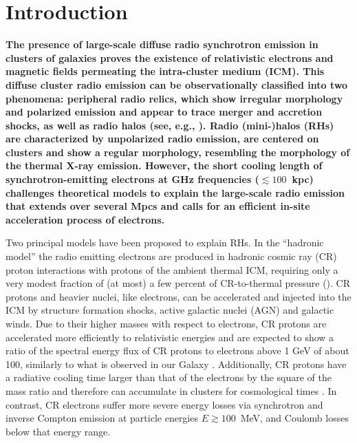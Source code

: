 \documentclass[useAMS,usenatbib]{mn2e}
\begin{document}
\section{Introduction}
\label{sec:1}

{\bf The presence of large-scale diffuse radio synchrotron emission in clusters
  of galaxies proves the existence of relativistic electrons and magnetic fields
  permeating the intra-cluster medium (ICM). This diffuse cluster radio emission
  can be observationally classified into two phenomena: peripheral radio relics,
  which show irregular morphology and polarized emission and appear to trace
  merger and accretion shocks, as well as radio halos (see, e.g.,
  \citealp{2012A&ARv..20...54F}).  Radio \mbox{(mini-)}halos (RHs) are
  characterized by unpolarized radio emission, are centered on clusters and
  show a regular morphology, resembling the morphology of the thermal X-ray
  emission. However, the short cooling length of synchrotron-emitting electrons
  at GHz frequencies ($\lesssim 100$~kpc) challenges theoretical models to
  explain the large-scale radio emission that extends over several Mpcs and
  calls for an efficient in-site acceleration process of electrons.}

Two principal models have been proposed to explain RHs.  In the ``hadronic
model'' the radio emitting electrons are produced in hadronic cosmic ray (CR)
proton interactions with protons of the ambient thermal ICM, requiring only a
very modest fraction of (at most) a few percent of CR-to-thermal pressure
(\citealp{1980ApJ...239L..93D,1982AJ.....87.1266V, 1999APh....12..169B,
  2000A&A...362..151D, 2001ApJ...562..233M,2001ApJ...559...59M,
  2003MNRAS.342.1009M,2003A&A...407L..73P, 2004A&A...413...17P,
  2004MNRAS.352...76P, 2007IJMPA..22..681B, 2008MNRAS.385.1211P,
  2008MNRAS.385.1242P, 2009JCAP...09..024K, 2010MNRAS.401...47D,
  2010arXiv1003.0336D, 2010arXiv1003.1133K, 2010arXiv1011.0729K,
  2011A&A...527A..99E}).  CR protons and heavier nuclei, like electrons, can be
accelerated and injected into the ICM by structure formation shocks, active
galactic nuclei (AGN) and galactic winds.  Due to their higher masses with
respect to electrons, CR protons are accelerated more efficiently to
relativistic energies and are expected to show a ratio of the spectral energy
flux of CR protons to electrons above 1 GeV of about 100, similarly to what is
observed in our Galaxy \citep{2002cra..book.....S}. Additionally, CR protons
have a radiative cooling time larger than that of the electrons by the square of
the mass ratio and therefore can accumulate in clusters for cosmological times
\citep{1996SSRv...75..279V}. In contrast, CR electrons suffer more severe energy
losses via synchrotron and inverse Compton emission at particle energies $E
\gtrsim 100$~MeV, and Coulomb losses below that energy range.
\end{document}
